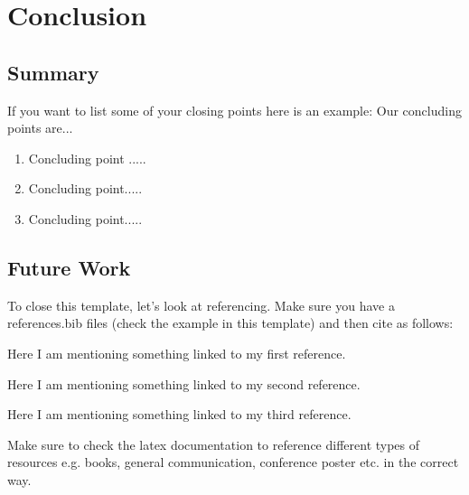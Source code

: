 \section{Conclusion}

\subsection{Summary}
\lipsum[2]

\noindent If you want to list some of your closing points here is an example:
Our concluding points are...
\begin{enumerate}
  \item Concluding point .....
  \item Concluding point.....
  \item Concluding point.....
\end{enumerate}


\subsection{Future Work}

\noindent To close this template, let's look at referencing. Make sure you have a references.bib files (check the example in this template) and then cite as follows:

\noindent Here I am mentioning something linked to my first reference. \cite{Barbero2012} 

\noindent Here I am mentioning something linked to my second reference. \cite{Farina2020}

\noindent Here I am mentioning something linked to my third reference. \cite{Saitou2000}

\noindent Make sure to check the latex documentation to reference different types of resources e.g. books, general communication, conference poster etc. in the correct way.

\newpage
